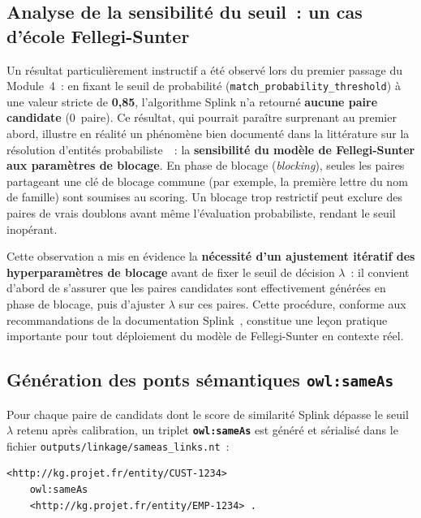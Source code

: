 \subsection{Analyse de la sensibilité du seuil~: un cas d'école
            Fellegi-Sunter}
\label{subsec:seuil_sensibilite}

Un résultat particulièrement instructif a été observé lors du premier
passage du Module~4~: en fixant le seuil de probabilité
(\texttt{match\_probability\_threshold}) à une valeur stricte de
\textbf{0,85}, l'algorithme Splink n'a retourné \textbf{aucune paire
candidate} (0~paire). Ce résultat, qui pourrait paraître surprenant au
premier abord, illustre en réalité un phénomène bien documenté dans
la littérature sur la résolution d'entités probabiliste~\cite{linacre2023splink}~:
la \textbf{sensibilité du modèle de Fellegi-Sunter aux paramètres de
blocage}. En phase de blocage (\textit{blocking}), seules les paires
partageant une clé de blocage commune (par exemple, la première lettre
du nom de famille) sont soumises au scoring. Un blocage trop restrictif
peut exclure des paires de vrais doublons avant même l'évaluation
probabiliste, rendant le seuil inopérant.

Cette observation a mis en évidence la \textbf{nécessité d'un
ajustement itératif des hyperparamètres de blocage} avant de fixer
le seuil de décision $\lambda$~: il convient d'abord de s'assurer que
les paires candidates sont effectivement générées en phase de blocage,
puis d'ajuster $\lambda$ sur ces paires. Cette procédure, conforme aux
recommandations de la documentation Splink~\cite{linacre2023splink},
constitue une leçon pratique importante pour tout déploiement du
modèle de Fellegi-Sunter en contexte réel.

\subsection{Génération des ponts sémantiques \texttt{owl:sameAs}}
\label{subsec:sameas}

Pour chaque paire de candidats dont le score de similarité Splink
dépasse le seuil $\lambda$ retenu après calibration, un triplet
\textbf{\texttt{owl:sameAs}} est généré et sérialisé dans le fichier
\texttt{outputs/linkage/sameas\_links.nt}~:

\begin{verbatim}
<http://kg.projet.fr/entity/CUST-1234>
    owl:sameAs
    <http://kg.projet.fr/entity/EMP-1234> .
\end{verbatim}

